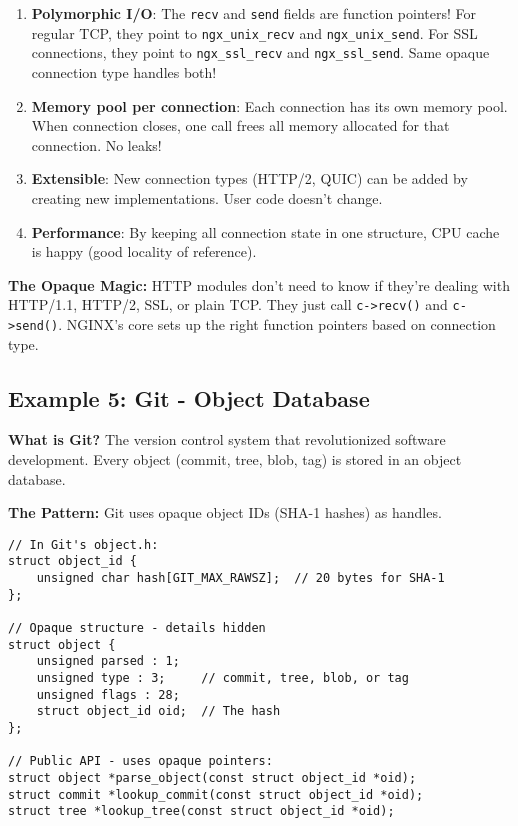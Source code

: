 \begin{enumerate}
    \item \textbf{Polymorphic I/O}: The \texttt{recv} and \texttt{send} fields are function pointers! For regular TCP, they point to \texttt{ngx\_unix\_recv} and \texttt{ngx\_unix\_send}. For SSL connections, they point to \texttt{ngx\_ssl\_recv} and \texttt{ngx\_ssl\_send}. Same opaque connection type handles both!

    \item \textbf{Memory pool per connection}: Each connection has its own memory pool. When connection closes, one call frees all memory allocated for that connection. No leaks!

    \item \textbf{Extensible}: New connection types (HTTP/2, QUIC) can be added by creating new implementations. User code doesn't change.

    \item \textbf{Performance}: By keeping all connection state in one structure, CPU cache is happy (good locality of reference).
\end{enumerate}

\textbf{The Opaque Magic:} HTTP modules don't need to know if they're dealing with HTTP/1.1, HTTP/2, SSL, or plain TCP. They just call \texttt{c->recv()} and \texttt{c->send()}. NGINX's core sets up the right function pointers based on connection type.

\subsection{Example 5: Git - Object Database}

\textbf{What is Git?} The version control system that revolutionized software development. Every object (commit, tree, blob, tag) is stored in an object database.

\textbf{The Pattern:} Git uses opaque object IDs (SHA-1 hashes) as handles.

\begin{lstlisting}
// In Git's object.h:
struct object_id {
    unsigned char hash[GIT_MAX_RAWSZ];  // 20 bytes for SHA-1
};

// Opaque structure - details hidden
struct object {
    unsigned parsed : 1;
    unsigned type : 3;     // commit, tree, blob, or tag
    unsigned flags : 28;
    struct object_id oid;  // The hash
};

// Public API - uses opaque pointers:
struct object *parse_object(const struct object_id *oid);
struct commit *lookup_commit(const struct object_id *oid);
struct tree *lookup_tree(const struct object_id *oid);
\end{lstlisting}

